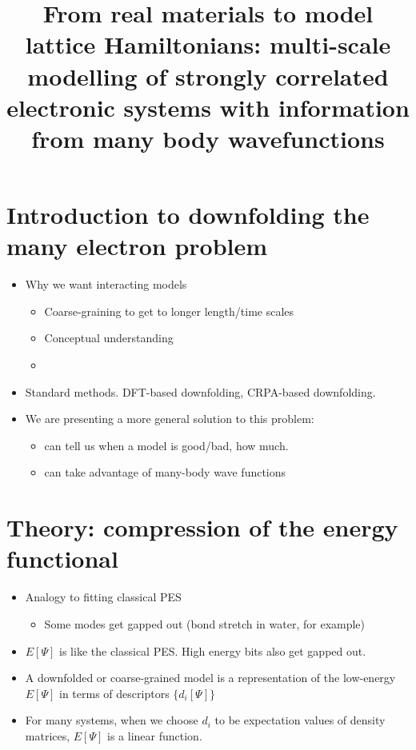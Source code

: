 \documentclass[prl,12pt,onecolumn,nofootinbib,notitlepage,english,superscriptaddress]{revtex4-1}
\newcommand{\lucas}[1]{{\color{GREEN}{\bf LKW: #1}}}
\begin{document}
\renewcommand{\thefootnote}{\fnsymbol{footnote}}
\renewcommand\abstractname{}
\title{From real materials to model lattice Hamiltonians: multi-scale modelling of strongly correlated electronic systems 
       with information from many body wavefunctions}

\maketitle




\section{Introduction to downfolding the many electron problem}
\begin{itemize}
\item Why we want interacting models
	\begin{itemize}
	\item Coarse-graining to get to longer length/time scales
	\item Conceptual understanding 
	\item \lucas{other thoughts?} 
	\end{itemize}
\item Standard methods. DFT-based downfolding, CRPA-based downfolding. \lucas{What is the issue with these methods? Accuracy? Being able to tell if a model is good or not? This will determine what we talk about in the paper. When are these methods good?} 
\item We are presenting a more general solution to this problem:
   \begin{itemize}
      \item  can tell us when a model is good/bad, how much.
      \item  can take advantage of many-body wave functions
    \end{itemize}
\end{itemize}

\section{Theory: compression of the energy functional}

\begin{itemize}
\item Analogy to fitting classical PES
    \begin{itemize}
    \item Some modes get gapped out (bond stretch in water, for example)
    \end{itemize}
\item $E[\Psi]$ is like the classical PES. High energy bits also get gapped out. 
\item A downfolded or coarse-grained model is a representation of the low-energy $E[\Psi]$ in terms of descriptors $\{d_i[\Psi]\}$
\item For many systems, when we choose $d_i$ to be expectation values of density matrices, $E[\Psi]$ is a linear function.
\end{itemize}
\end{document}
